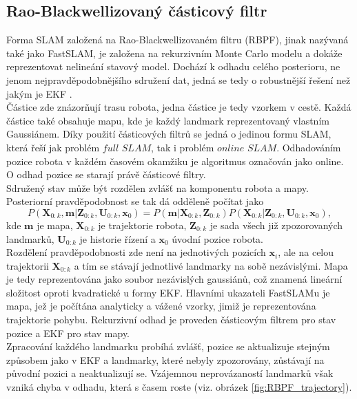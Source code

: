 \documentclass[12pt]{report}
\begin{document}
\subsection{Rao-Blackwellizovaný částicový filtr}
Forma SLAM založená na Rao-Blackwellizovaném filtru (RBPF), jinak nazývaná také jako FastSLAM, je založena na rekurzivním Monte Carlo modelu a dokáže reprezentovat nelineání stavový model. Dochází k odhadu celého posterioru, ne jenom nejpravděpodobnějšího sdružení dat, jedná se tedy o robustnější řešení než jakým je EKF \cite{Thrun2005}. \\
\indent Částice zde znázorňují trasu robota, jedna částice je tedy vzorkem v cestě. Každá částice také obsahuje mapu, kde je každý landmark reprezentovaný vlastním Gaussiánem. Díky použití částicových filtrů se jedná o jedinou formu SLAM, která řeší jak problém $full$ $SLAM$, tak i problém $online$ $SLAM$. Odhadováním pozice robota v každém časovém okamžiku je algoritmus označován jako online. O odhad pozice se starají právě částicové filtry.\\
\indent Sdružený stav může být rozdělen zvlášť na komponentu robota a mapy. Posteriorní pravděpodobnost se tak dá odděleně počítat jako
\begin{equation}
	P(\textbf{X}_{0:k},\textbf{m}|\textbf{Z}_{0:k},\textbf{U}_{0:k},\textbf{x}_0)=P(\textbf{m}|\textbf{X}_{0:k},\textbf{Z}_{0:k})P(\textbf{X}_{0:k}|\textbf{Z}_{0:k},\textbf{U}_{0:k},\textbf{x}_0),
\end{equation}
kde $\textbf{m}$ je mapa, $\textbf{X}_{0:k}$ je trajektorie robota, $\textbf{Z}_{0:k}$ je sada všech již zpozorovaných landmarků, $\textbf{U}_{0:k}$ je historie řízení a $\textbf{x}_0$ úvodní pozice robota.\\
\indent Rozdělení pravděpodobnosti zde není na jednotivých pozicích $\textbf{x}_i$, ale na celou trajektorii $\textbf{X}_{0:k}$ a tím se stávají jednotlivé landmarky na sobě nezávislými. Mapa je tedy reprezentována jako soubor nezávislých gaussiánů, což znamená lineární složitost oproti kvadratické u formy EKF. Hlavními ukazateli FastSLAMu je mapa, jež je počítána analyticky a vážené vzorky, jimiž je reprezentována trajektorie pohybu. Rekurzivní odhad je proveden částicovým filtrem pro stav pozice a EKF pro stav mapy.\\
\indent Zpracování každého landmarku probíhá zvlášť, pozice se aktualizuje stejným způsobem jako v EKF a landmarky, které nebyly zpozorovány, zůstávají na původní pozici a neaktualizují se. Vzájemnou neprovázaností landmarků však vzniká chyba v odhadu, která s časem roste (viz. obrázek \ref{fig:RBPF_trajectory}).\\
\end{document}

